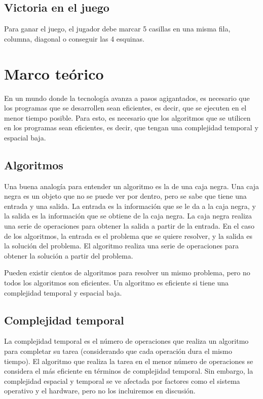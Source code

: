 \documentclass[10pt,twocolumn]{article}
\begin{document}
\subsection{Victoria en el juego}

Para ganar el juego, el jugador debe marcar 5 casillas en una misma fila, columna, diagonal o conseguir las 4 esquinas.

\section{Marco teórico}

En un mundo donde la tecnología avanza a pasos agigantados, es necesario que los programas que se desarrollen sean eficientes, es decir, que se ejecuten en el menor tiempo posible. Para esto, es necesario que los algoritmos que se utilicen en los programas sean eficientes, es decir, que tengan una complejidad temporal y espacial baja.

\subsection{Algoritmos}

Una buena analogía para entender un algoritmo es la de una caja negra. Una caja negra es un objeto que no se puede ver por dentro, pero se sabe que tiene una entrada y una salida. La entrada es la información que se le da a la caja negra, y la salida es la información que se obtiene de la caja negra. La caja negra realiza una serie de operaciones para obtener la salida a partir de la entrada. En el caso de los algoritmos, la entrada es el problema que se quiere resolver, y la salida es la solución del problema. El algoritmo realiza una serie de operaciones para obtener la solución a partir del problema.

Pueden existir cientos de algoritmos para resolver un mismo problema, pero no todos los algoritmos son eficientes. Un algoritmo es eficiente si tiene una complejidad temporal y espacial baja. \cite{brendomatos2020algorithm}


\subsection{Complejidad temporal}

La complejidad temporal es el número de operaciones que realiza un algoritmo para completar su tarea (considerando que cada operación dura el mismo tiempo). El algoritmo que realiza la tarea en el menor número de operaciones se considera el más eficiente en términos de complejidad temporal. Sin embargo, la complejidad espacial y temporal se ve afectada por factores como el sistema operativo y el hardware, pero no los incluiremos en discusión. \cite{rivera2021introduccion}
\end{document}

